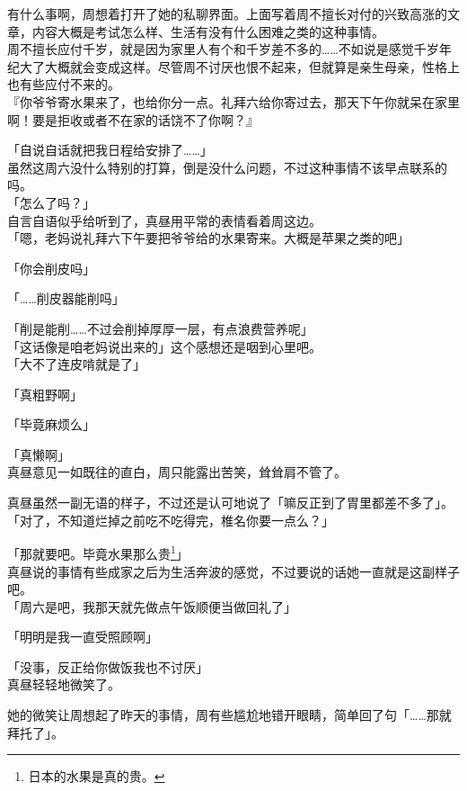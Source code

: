 有什么事啊，周想着打开了她的私聊界面。上面写着周不擅长对付的兴致高涨的文章，内容大概是考试怎么样、生活有没有什么困难之类的这种事情。\\

周不擅长应付千岁，就是因为家里人有个和千岁差不多的……不如说是感觉千岁年纪大了大概就会变成这样。尽管周不讨厌也恨不起来，但就算是亲生母亲，性格上也有些应付不来的。\\

『你爷爷寄水果来了，也给你分一点。礼拜六给你寄过去，那天下午你就呆在家里啊！要是拒收或者不在家的话饶不了你啊？』

「自说自话就把我日程给安排了……」\\

虽然这周六没什么特别的打算，倒是没什么问题，不过这种事情不该早点联系的吗。\\

「怎么了吗？」\\

自言自语似乎给听到了，真昼用平常的表情看着周这边。\\

「嗯，老妈说礼拜六下午要把爷爷给的水果寄来。大概是苹果之类的吧」

「你会削皮吗」

「……削皮器能削吗」

「削是能削……不过会削掉厚厚一层，有点浪费营养呢」\\

「这话像是咱老妈说出来的」这个感想还是咽到心里吧。\\

「大不了连皮啃就是了」

「真粗野啊」

「毕竟麻烦么」

「真懒啊」\\

真昼意见一如既往的直白，周只能露出苦笑，耸耸肩不管了。

真昼虽然一副无语的样子，不过还是认可地说了「嘛反正到了胃里都差不多了」。\\

「对了，不知道烂掉之前吃不吃得完，椎名你要一点么？」

「那就要吧。毕竟水果那么贵\footnote{日本的水果是真的贵。}」\\

真昼说的事情有些成家之后为生活奔波的感觉，不过要说的话她一直就是这副样子吧。\\

「周六是吧，我那天就先做点午饭顺便当做回礼了」

「明明是我一直受照顾啊」

「没事，反正给你做饭我也不讨厌」\\

真昼轻轻地微笑了。

她的微笑让周想起了昨天的事情，周有些尴尬地错开眼睛，简单回了句「……那就拜托了」。
